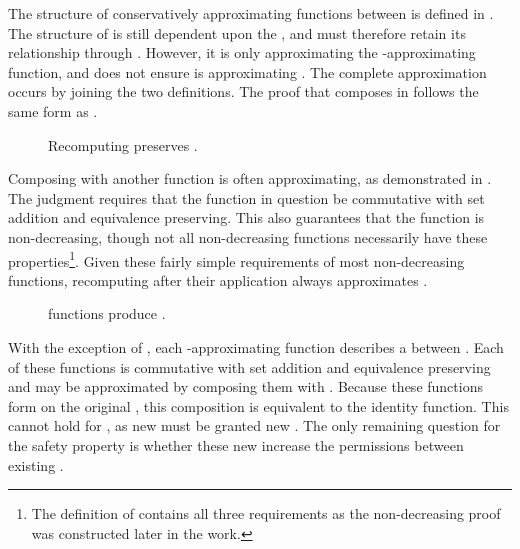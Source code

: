 The structure of conservatively approximating functions between \TMpotAccAGs{} is defined in .
The structure of \COQpotAccApproxDirAccDep{} is still dependent upon the \TMsystemState{}, and must therefore retain its relationship through \TMdirAcc{}.
However, it is only approximating the \TMdirAcc{}-approximating function, and does not ensure   is approximating \TMdirAcc{}.
The complete approximation occurs by joining the two definitions.
The proof that \COQpotAccApproxDirAccDep{} composes in  follows the same form as \COQdirAccMDep{}.

\begin{figure}
  \COQDOCpotAccM{}
  \COQDOCpotAccMcomputePotAcc{}
  \COQDOCpotAccMPotAccMDirAccDep{}
  \caption{Recomputing \TMpotAcc{} preserves \COQpotAccApproxDirAccDep{}. \label{fig:safety:potAccMPotAcc}}
\end{figure}

Composing \COQpotAccFun{} with another function is often \TMpotAcc{} approximating, as demonstrated in .
The \COQagPotTransferFnReq{} judgment requires that the function in question be commutative with set addition and equivalence preserving.
This also guarantees that the function is non-decreasing, though not all non-decreasing functions necessarily have these properties\footnote{The definition of \COQagPotTransferFnReq{} contains all three requirements as the non-decreasing proof was constructed later in the work.}.
Given these fairly simple requirements of most non-decreasing functions, recomputing \TMpotAcc{} after their application always approximates \TMpotAcc{}.

\begin{figure}
  \COQDOCpotTransSendDepAg{}
  \COQDOCpotTransStoreDepAg{}
  \COQDOCpotTransFetchDepAg{}
  \caption{\xmakefirstuc{\TMdirAcc} functions produce \TMpotTransfers{}.}
\end{figure}

With the exception of \COQcreate{}, each \TMdirAcc{}-approximating function describes a \COQpotTransfer{} between \TMaccessGraphs{}.
Each of these functions is commutative with set addition and equivalence preserving and may be approximated by composing them with \COQpotAccFun{}.
Because these functions form \TMpotTransfers{} on the original \TMpotAccAG{}, this composition is equivalent to the identity function.
This cannot hold for \TMcreate{}, as new \TMobjs{} must be granted new \TMaccessRights{}.
The only remaining question for the safety property is whether these new \TMcaps{} increase the permissions between existing \TMobjs{}.

